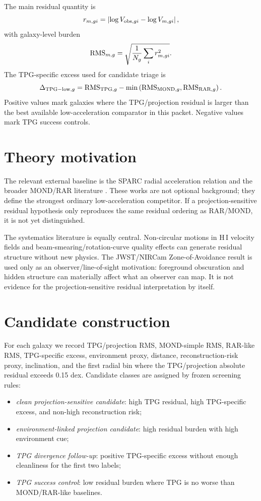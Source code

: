 \documentclass[11pt]{article}
\begin{document}
The main residual quantity is
\[
r_{m,gi}=\left|\log V_{{\rm obs},gi}-\log V_{m,gi}\right|,
\]
with galaxy-level burden
\[
{\rm RMS}_{{m,g}}=\sqrt{\frac{1}{N_g}\sum_i r_{{m,gi}}^2}.
\]
The TPG-specific excess used for candidate triage is
\[
\Delta_{{\rm TPG-low},g}=
{\rm RMS}_{{\rm TPG},g}-
\min\left({\rm RMS}_{{\rm MOND},g},{\rm RMS}_{{\rm RAR},g}\right).
\]
Positive values mark galaxies where the TPG/projection residual is larger than the best available low-acceleration comparator in this packet. Negative values mark TPG success controls.

\section{Theory motivation}

The relevant external baseline is the SPARC radial acceleration relation \cite{McGaugh2016RAR,Lelli2016SPARC} and the broader MOND/RAR literature \cite{Milgrom1983MOND,Li2018RARFits}. These works are not optional background; they define the strongest ordinary low-acceleration competitor. If a projection-sensitive residual hypothesis only reproduces the same residual ordering as RAR/MOND, it is not yet distinguished.

The systematics literature is equally central. Non-circular motions in H\,I velocity fields \cite{Trachternach2008THINGS,Oman2019NonCircular} and beam-smearing/rotation-curve quality effects \cite{deBlok1997Beam} can generate residual structure without new physics. The JWST/NIRCam Zone-of-Avoidance result \cite{NiloCastellon2025ZoA} is used only as an observer/line-of-sight motivation: foreground obscuration and hidden structure can materially affect what an observer can map. It is not evidence for the projection-sensitive residual interpretation by itself.

\section{Candidate construction}

For each galaxy we record TPG/projection RMS, MOND-simple RMS, RAR-like RMS, TPG-specific excess, environment proxy, distance, reconstruction-risk proxy, inclination, and the first radial bin where the TPG/projection absolute residual exceeds 0.15 dex. Candidate classes are assigned by frozen screening rules:
\begin{itemize}
\item \textit{clean projection-sensitive candidate}: high TPG residual, high TPG-specific excess, and non-high reconstruction risk;
\item \textit{environment-linked projection candidate}: high residual burden with high environment cue;
\item \textit{TPG divergence follow-up}: positive TPG-specific excess without enough cleanliness for the first two labels;
\item \textit{TPG success control}: low residual burden where TPG is no worse than MOND/RAR-like baselines.
\end{itemize}
\end{document}
